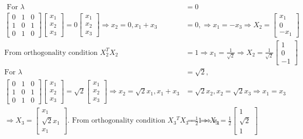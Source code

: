 \begin{enumerate}
\begin{answer}
\begin{align*}
	\text{	For }\lambda&=0\\
		\left[\begin{array}{lll}
		0 & 1 & 0 \\
		1 & 0 & 1 \\
		0 & 1 & 0
		\end{array}\right]\left[\begin{array}{l}
		x_{1} \\
		x_{2} \\
		x_{3}
		\end{array}\right]=0\left[\begin{array}{c}
		x_{1} \\
		x_{2} \\
		x_{3}
		\end{array}\right] \Rightarrow x_{2}=0, x_{1}+x_{3}&=0, \Rightarrow x_{1}=-x_{3} \Rightarrow X_{2}=\left[\begin{array}{c}
		x_{1} \\
		0 \\
		-x_{1}
		\end{array}\right]\\
		\text{From orthogonality condition }X_{2}^{T} X_{2}&=1 \Rightarrow x_{1}=\frac{1}{\sqrt{2}} \Rightarrow X_{2}=\frac{1}{\sqrt{2}}\left[\begin{array}{c}1 \\ 0 \\ -1\end{array}\right]\\
		\text{For }\lambda&=\sqrt{2},\\
		\left[\begin{array}{lll}
		0 & 1 & 0 \\
		1 & 0 & 1 \\
		0 & 1 & 0
		\end{array}\right]\left[\begin{array}{l}
		x_{1} \\
		x_{2} \\
		x_{3}
		\end{array}\right]=\sqrt{2}\left[\begin{array}{l}
		x_{1} \\
		x_{2} \\
		x_{3}
		\end{array}\right] \Rightarrow x_{2}=\sqrt{2} x_{1}, x_{1}+x_{3}&=\sqrt{2} x_{2}, x_{2}=\sqrt{2} x_{3} \Rightarrow x_{1}=x_{3}\\
		\Rightarrow X_{3}=\left[\begin{array}{c}x_{1} \\ \sqrt{2} x_{1} \\ x_{1}\end{array}\right] .\text{ From orthogonality condition }X_{3}{ }^{T} X_{3}=1 \Rightarrow x_{1}&=\frac{1}{2} \Rightarrow X_{3}=\frac{1}{2}\left[\begin{array}{c}1 \\ \sqrt{2} \\ 1\end{array}\right]

\end{align*}
\end{answer}
\end{enumerate}
